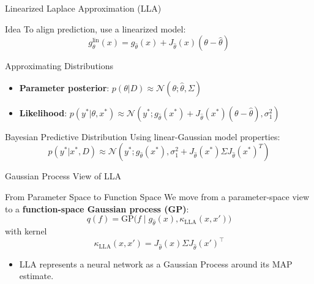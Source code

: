 \documentclass{beamer}
\begin{document}
\begin{frame}{Linearized Laplace Approximation (LLA)}

\begin{block}{Idea}
To align prediction, use a linearized model:
\[
g_\theta^{\text{lin}}(x) = g_{\hat{\theta}}(x) + J_{\hat{\theta}}(x)(\theta - \hat{\theta})
\]
\end{block}

\begin{block}{Approximating Distributions}
\begin{itemize}
    \item \textbf{Parameter posterior}: $p(\theta|D) \approx \mathcal{N}(\theta; \hat{\theta}, \Sigma)$
    \item \textbf{Likelihood}: $p(y^*|\theta, x^*) \approx \mathcal{N}(y^*; g_{\hat{\theta}}(x^*) + J_{\hat{\theta}}(x^*)(\theta - \hat{\theta}), \sigma_1^2)$
\end{itemize}
\end{block}

\begin{block}{Bayesian Predictive Distribution}
Using linear-Gaussian model properties:
\[
p(y^*|x^*, D) \approx \mathcal{N}\left(y^*; g_{\hat{\theta}}(x^*), \sigma_1^2 + J_{\hat{\theta}}(x^*) \Sigma J_{\hat{\theta}}(x^*)^T\right)
\]
\end{block}

\end{frame}

\begin{frame}{Gaussian Process View of LLA}

\begin{block}{From Parameter Space to Function Space}
We move from a parameter-space view to a
\textbf{function-space Gaussian process (GP)}:
$$
q(f) = \mathrm{GP}\big(f \mid g_{\hat{\theta}}(x), \kappa_{\text{LLA}}(x, x')\big)
$$
with kernel
$$
\kappa_{\text{LLA}}(x, x') = J_{\hat{\theta}}(x)\Sigma J_{\hat{\theta}}(x')^\top
$$
\end{block}

\begin{itemize}
    \item LLA represents a neural network as a Gaussian Process around its MAP estimate.
\end{itemize}

\end{frame}
\end{document}
